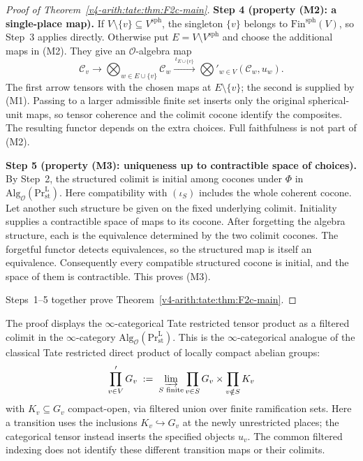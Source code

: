 \begin{proof}[Proof of Theorem~\ref{v4-arith:tate:thm:F2c-main}]
\medskip\noindent\textbf{Step 4 (property (M2): a single-place map).}
If \(V\setminus\{v\}\subseteq V^{\mathrm{sph}}\), the singleton
\(\{v\}\) belongs to \(\mathrm{Fin}^{\mathrm{sph}}(V)\), so Step~3
applies directly. Otherwise put
\(E=V\setminus V^{\mathrm{sph}}\) and choose the additional maps
in (M2). They give an \(\mathcal O\)-algebra map
\[
\mathcal C_v\longrightarrow
\bigotimes_{w\in E\cup\{v\}}\mathcal C_w
\xrightarrow{\,\iota_{E\cup\{v\}}\,}
\bigotimes'_{w\in V}(\mathcal C_w,u_w).
\]
The first arrow tensors with the chosen maps at \(E\setminus\{v\}\);
the second is supplied by (M1). Passing to a larger admissible
finite set inserts only the original spherical-unit maps, so
tensor coherence and the colimit cocone identify the composites.
The resulting functor depends on the extra choices. Full
faithfulness is not part of (M2).

\medskip\noindent\textbf{Step 5 (property (M3): uniqueness up to contractible space of choices).}
By Step~2, the structured colimit is initial among cocones under
\(\Phi\) in
\(\mathrm{Alg}_{\mathcal O}(\mathrm{Pr}^{\mathrm L}_{\mathrm{st}})\).
Here compatibility with \((\iota_S)\) includes the whole coherent
cocone. Let another such structure be given on the fixed underlying
colimit. Initiality supplies a contractible space of maps to its
cocone. After forgetting the algebra structure, each is the
equivalence determined by the two colimit cocones. The forgetful
functor detects equivalences, so the structured map is itself an
equivalence. Consequently every compatible structured cocone is
initial, and the space of them is contractible. This proves (M3).

Steps~1--5 together prove Theorem~\ref{v4-arith:tate:thm:F2c-main}.
\end{proof}

\begin{remark}
\label{v4-arith:tate:rem:cat-content}
The proof displays the \(\infty\)-categorical Tate restricted tensor
product as a filtered colimit in the \(\infty\)-category
\(\mathrm{Alg}_{\mathcal{O}}(\mathrm{Pr}^{\mathrm{L}}_{\mathrm{st}})\).
This is the \(\infty\)-categorical analogue of the classical Tate
restricted direct product of locally compact abelian groups:
\[
\prod_{v\in V}^{\prime}G_{v}\;:=\;\varinjlim_{S\text{ finite}}\prod_{v\in S}G_{v}\times\prod_{v\notin S}K_{v}
\]
with \(K_{v}\subseteq G_{v}\) compact-open, via filtered union over
finite ramification sets. Here a transition uses the inclusions
\(K_v\hookrightarrow G_v\) at the newly unrestricted places; the
categorical tensor instead inserts the specified objects \(u_v\).
The common filtered indexing does not identify these different
transition maps or their colimits.
\end{remark}

